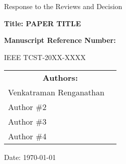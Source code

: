 \begin{titlepage}
    \centering
    {\LARGE Response to the Reviews and Decision \par}
    \vspace{1.5cm}

    {\large \bfseries Title: PAPER TITLE	 \par}
    \vspace{1.5cm}

    {\large \bfseries Manuscript Reference Number: \par
        IEEE TCST-20XX-XXXX}
    \vspace{1.5cm}

    \begin{table}[h!]
        \renewcommand{\arraystretch}{1}
        \centering
        \begin{tabular}{lc}
            \multicolumn{2}{c}{\large \bfseries Authors:} \\
            \large Venkatraman Renganathan                \\
            \large Author \#2                             \\
            \large Author \#3                             \\
            \large Author \#4                             \\
        \end{tabular}
    \end{table}
    \vspace{1.5cm}
    \large Date: \today

\end{titlepage}
